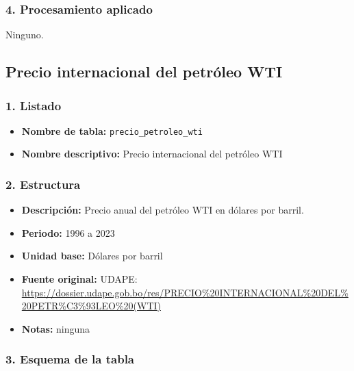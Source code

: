 \documentclass[12pt,a4paper]{article}
\begin{document}
\subsubsection*{4. Procesamiento aplicado}
Ninguno.

\subsection{Precio internacional del petróleo WTI}

\subsubsection*{1. Listado}
\begin{itemize}
  \item \textbf{Nombre de tabla:} \texttt{precio\_petroleo\_wti}
  \item \textbf{Nombre descriptivo:} Precio internacional del petróleo WTI
\end{itemize}

\subsubsection*{2. Estructura}
\begin{itemize}
  \item \textbf{Descripción:} Precio anual del petróleo WTI en dólares por barril.
  \item \textbf{Periodo:} 1996 a 2023
  \item \textbf{Unidad base:} Dólares por barril
  \item \textbf{Fuente original:} UDAPE:\\
    \url{https://dossier.udape.gob.bo/res/PRECIO%20INTERNACIONAL%20DEL%20PETR%C3%93LEO%20(WTI)}
  \item \textbf{Notas:} ninguna
\end{itemize}

\subsubsection*{3. Esquema de la tabla}
\end{document}
